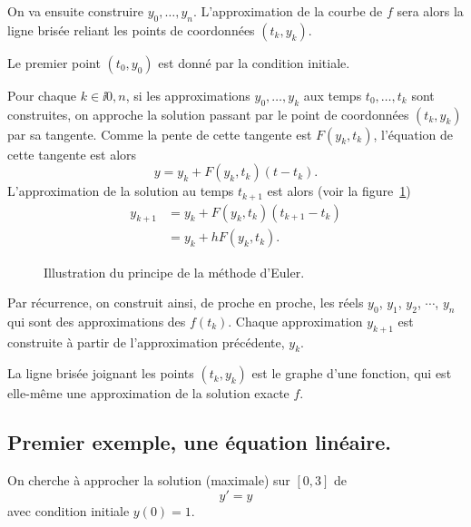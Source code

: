 
On va ensuite construire $y_0,\dots,y_n$. L'approximation de la courbe de $f$ sera alors la ligne brisée reliant les points de coordonnées $(t_k,y_k)$. 

Le premier point $(t_0,y_0)$ est donné par la condition initiale. 

Pour chaque $k \in \ii{0,n}$, si les approximations $y_0,\dots,y_k$ aux temps $t_0,\dots,t_k$ sont construites, on approche la solution passant par le point de coordonnées $(t_k,y_k)$ par sa tangente. 
Comme la pente de cette tangente est $F(y_k,t_k)$, l'équation de cette tangente est alors 
\begin{equation*}
  y = y_k + F(y_k,t_k) (t-t_k). 
\end{equation*}
L'approximation de la solution au temps $t_{k+1}$ est alors (voir la figure~\ref{11:fig:principeEuler})
\begin{align*}
  y_{k+1} &= y_k + F(y_k,t_k) (t_{k+1}-t_k) \\
          &= y_k + hF(y_k,t_k).
\end{align*}



\begin{figure}[h!]
\begin{center}
\resizebox{0.8\textwidth}{!}{}
\caption{Illustration du principe de la méthode d'Euler.}
\label{11:fig:principeEuler}
\end{center}
\end{figure}

Par récurrence, on construit ainsi, de proche en proche, les réels $y_0$, $y_1$, $y_2$, $\cdots$, $y_n$ qui 
sont des approximations des $f(t_k)$. Chaque approximation $y_{k+1}$ est construite à partir de 
l'approximation précédente, $y_k$.

La ligne brisée joignant les points $(t_k,y_k)$ est le graphe d'une fonction, qui est elle-même une 
approximation de la solution exacte $f$.

\subsection{Premier exemple, une équation linéaire.}
On cherche à approcher la solution (maximale) sur $[0,3]$ de
\begin{equation*}
  y' = y
\end{equation*}
avec condition initiale $y(0)=1$.

